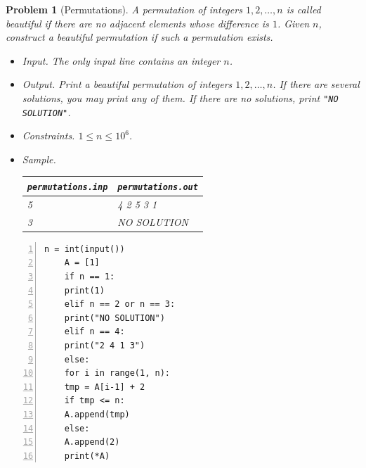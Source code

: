 \documentclass{article}
\newtheorem{problem}{Problem}
\begin{document}
\begin{problem}[Permutations]
	A permutation of integers $1,2,\ldots,n$ is called \emph{beautiful} if there are no adjacent elements whose difference is $1$. Given $n$, construct a beautiful permutation if such a permutation exists.
	\begin{itemize}
		\item {\sf Input.} The only input line contains an integer $n$.
		\item {\sf Output.} Print a beautiful permutation of integers $1,2,\ldots,n$. If there are several solutions, you may print any of them. If there are no solutions, print \verb|"NO SOLUTION"|.
		\item {\sf Constraints.} $1\le n\le10^6$.
		\item {\sf Sample.}
		\begin{table}[H]
			\centering
			\begin{tabular}{|l|l|}
				\hline
				\verb|permutations.inp| & \verb|permutations.out| \\
				\hline
				5 & 4 2 5 3 1 \\
				\hline
				3 & NO SOLUTION \\
				\hline
			\end{tabular}
		\end{table}
	\end{itemize}
\end{problem}

\begin{Verbatim}[numbers=left,xleftmargin=5mm]
	n = int(input())
	A = [1]
	if n == 1:
	print(1)
	elif n == 2 or n == 3:
	print("NO SOLUTION")
	elif n == 4:
	print("2 4 1 3")
	else:
	for i in range(1, n):
	tmp = A[i-1] + 2
	if tmp <= n:
	A.append(tmp)
	else:
	A.append(2)
	print(*A)
\end{Verbatim}
\end{document}
